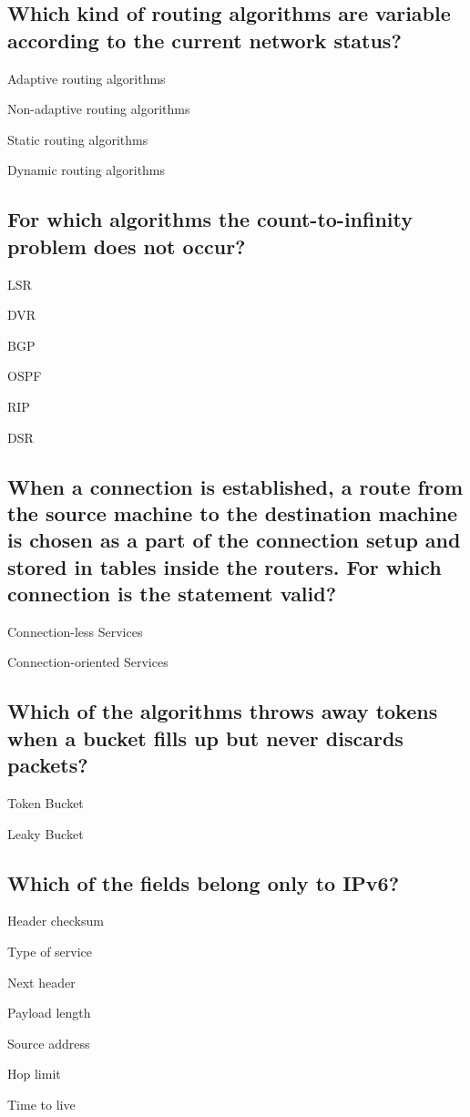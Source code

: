 \documentclass[a4paper,
			llpt,
			solution,
			accentcolor=tud2d,
			colorbacktitle
			]
			{tudexercise}
\newcommand{\8}{$\infty$}
\begin{document}
\subsection{Which kind of routing algorithms are variable according to the current network status?}
\begin{compactenum}
\item Adaptive routing algorithms
\item Non-adaptive routing algorithms
\item Static routing algorithms
\item Dynamic routing algorithms
\end{compactenum}
\subsection{For which algorithms the count-to-infinity problem does not occur?}
\begin{compactenum}
\item LSR
\item DVR
\item BGP
\item OSPF
\item RIP
\item DSR
\end{compactenum}
\subsection{When a connection is established, a route from the source machine to the destination machine is chosen as a part of the connection setup and stored in tables inside the routers. For which connection is the statement valid?}
\begin{compactenum}
\item \textcolor{litegray}{Connection-less Services}
\item \textcolor{tud2d}{Connection-oriented Services}
\end{compactenum}
\subsection{Which of the algorithms throws away tokens when a bucket fills up but never discards packets?}
\begin{compactenum}
\item \textcolor{tud2d}{Token Bucket}
\item \textcolor{litegray}{Leaky Bucket}
\end{compactenum}
\subsection{Which of the fields belong only to IPv6?}
\begin{compactenum}
\item Header checksum
\item Type of service
\item Next header
\item Payload length
\item Source address
\item Hop limit
\item Time to live
\end{compactenum}
\end{document}
